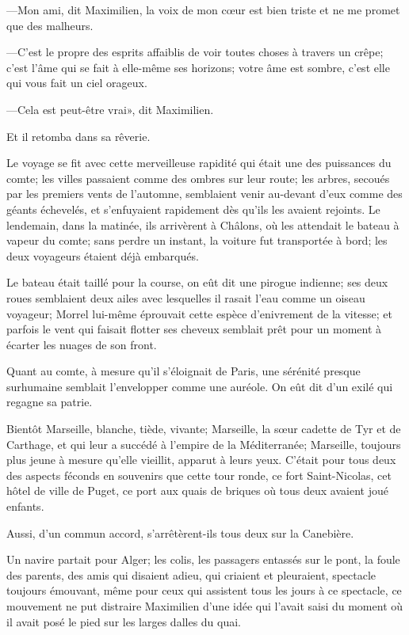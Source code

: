 —Mon ami, dit Maximilien, la voix de mon cœur est bien triste et ne me promet que des malheurs. 

—C'est le propre des esprits affaiblis de voir toutes choses à travers un crêpe; c'est l'âme qui se fait à elle-même ses horizons; votre âme est sombre, c'est elle qui vous fait un ciel orageux. 

—Cela est peut-être vrai», dit Maximilien. 

Et il retomba dans sa rêverie. 

Le voyage se fit avec cette merveilleuse rapidité qui était une des puissances du comte; les villes passaient comme des ombres sur leur route; les arbres, secoués par les premiers vents de l'automne, semblaient venir au-devant d'eux comme des géants échevelés, et s'enfuyaient rapidement dès qu'ils les avaient rejoints. Le lendemain, dans la matinée, ils arrivèrent à Châlons, où les attendait le bateau à vapeur du comte; sans perdre un instant, la voiture fut transportée à bord; les deux voyageurs étaient déjà embarqués. 

Le bateau était taillé pour la course, on eût dit une pirogue indienne; ses deux roues semblaient deux ailes avec lesquelles il rasait l'eau comme un oiseau voyageur; Morrel lui-même éprouvait cette espèce d'enivrement de la vitesse; et parfois le vent qui faisait flotter ses cheveux semblait prêt pour un moment à écarter les nuages de son front. 

Quant au comte, à mesure qu'il s'éloignait de Paris, une sérénité presque surhumaine semblait l'envelopper comme une auréole. On eût dit d'un exilé qui regagne sa patrie. 

Bientôt Marseille, blanche, tiède, vivante; Marseille, la sœur cadette de Tyr et de Carthage, et qui leur a succédé à l'empire de la Méditerranée; Marseille, toujours plus jeune à mesure qu'elle vieillit, apparut à leurs yeux. C'était pour tous deux des aspects féconds en souvenirs que cette tour ronde, ce fort Saint-Nicolas, cet hôtel de ville de Puget, ce port aux quais de briques où tous deux avaient joué enfants. 

Aussi, d'un commun accord, s'arrêtèrent-ils tous deux sur la Canebière. 

Un navire partait pour Alger; les colis, les passagers entassés sur le pont, la foule des parents, des amis qui disaient adieu, qui criaient et pleuraient, spectacle toujours émouvant, même pour ceux qui assistent tous les jours à ce spectacle, ce mouvement ne put distraire Maximilien d'une idée qui l'avait saisi du moment où il avait posé le pied sur les larges dalles du quai. 

